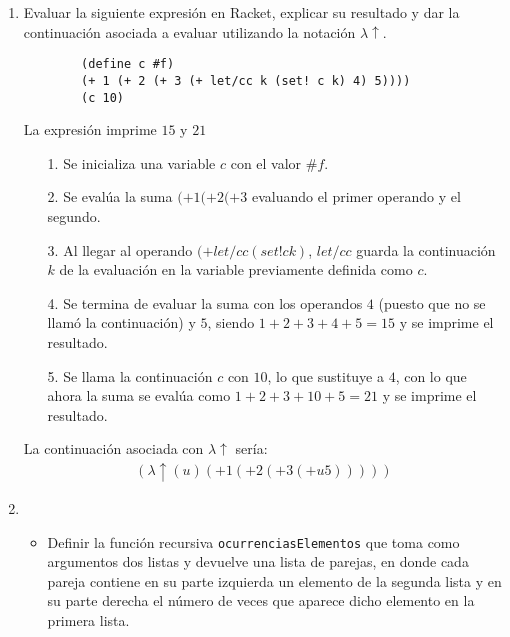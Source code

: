 \begin{enumerate}
{\begin{itemize}
\begin{verbatim}
                (lambda (sum) (lambda (Y)(lambda (sum))) 5)
                beta redux: (lambda (n) (if0 n 0 (+ n ((Y)(sum)) (-5 1)) 5)).
                eval: (+ 5 (((Y)(sum)) (- 5 1))).
                eval: (+ 5 (((Y)(sum)) (4)))
            \end{verbatim}
            Tenemos ahora nuestra Y sum con 4, entonces repitiendo los pasos anteriores con Y sum n-1, y simulando una recursion solamente con lets dentro de nuestro minilisp, nuestro resultado final sera 15. que sera la suma de la evaluacion final que tenemos al llegar a 0 que seria 0+1+2+3+4+5=15.
        \end{itemize}
    }
    \item { Evaluar la siguiente expresión en Racket, explicar su resultado y dar la continuación asociada a evaluar
    utilizando la notación $\lambda\uparrow$.
    \begin{verbatim}
        (define c #f)
        (+ 1 (+ 2 (+ 3 (+ let/cc k (set! c k) 4) 5))))
        (c 10)
    \end{verbatim}
    La expresión imprime $15$ y $21$
    \begin{itemize}
        \item [1.] Se inicializa una variable $c$ con el valor $\#f$.
        \item [2.] Se evalúa la suma $(+ 1 (+ 2 (+ 3$ evaluando el primer operando y el segundo.
        \item[3.]  Al llegar al operando $(+ let/cc (set! c k)$, $let/cc$ guarda la continuación $k$ de la evaluación
        en la variable previamente definida como $c$.
        \item [4.] Se termina de evaluar la suma con los operandos $4$ (puesto que no se llamó la continuación) y $5$, siendo $1 + 2 + 3 + 4 + 5 = 15$ y se imprime el resultado.
        \item [5.] Se llama la continuación $c$ con $10$, lo que sustituye a $4$, con lo que ahora la suma se evalúa
        como $1 + 2 + 3 + 10 + 5 = 21$ y se imprime el resultado.
    \end{itemize}
    La continuación asociada con $\lambda \uparrow$ sería:
    \begin{align*}
        (\lambda\uparrow(u) (+ 1 (+ 2 (+ 3 (+ u 5)))))
    \end{align*}
    }
    \newpage
    \item {
        \begin{itemize}
            \item {Definir la función recursiva \verb|ocurrenciasElementos| que toma como argumentos dos listas y devuelve una lista de parejas, en donde cada pareja contiene en su parte izquierda un elemento de la segunda lista y en su parte derecha el número de veces que aparece dicho elemento en la primera lista.

}
\end{itemize}}
\end{enumerate}
